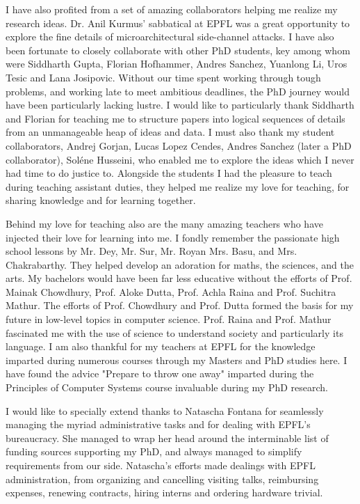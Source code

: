 I have also profited from a set of amazing collaborators helping me realize my
research ideas. 
Dr. Anil Kurmus' sabbatical at EPFL was a great opportunity to explore the
fine details of microarchitectural side-channel attacks.
I have also been fortunate to closely collaborate with other PhD students,
key among whom were Siddharth Gupta, Florian Hofhammer, Andres Sanchez, Yuanlong Li,
Uros Tesic and Lana Josipovic. 
Without our time spent working through tough problems, and working late to meet
ambitious deadlines, the PhD journey would have been particularly lacking lustre.
I would like to particularly thank Siddharth and Florian for teaching me to
structure papers into logical sequences of details from an unmanageable heap of
ideas and data.
I must also thank my student collaborators, Andrej Gorjan, Lucas Lopez Cendes, 
Andres Sanchez (later a PhD collaborator), Soléne Husseini, who enabled me to 
explore the ideas which I never had time to do justice to. 
Alongside the students I had the pleasure to teach during teaching assistant
duties, they helped me realize my love for teaching, for sharing knowledge
and for learning together.

Behind my love for teaching also are the many amazing teachers who have
injected their love for learning into me.
I fondly remember the passionate high school lessons by 
Mr. Dey, Mr. Sur, Mr. Royan Mrs. Basu, and Mrs. Chakrabarthy.
They helped develop an adoration for maths, the sciences, and the arts.
My bachelors would have been far less educative without the efforts 
of Prof. Mainak Chowdhury, Prof. Aloke Dutta, Prof. Achla Raina
and Prof. Suchitra Mathur.
The efforts of Prof. Chowdhury and Prof. Dutta formed the basis for my
future in low-level topics in computer science. 
Prof. Raina and Prof. Mathur fascinated me with the use of science to
understand society and particularly its language.
I am also thankful for my teachers at EPFL for the knowledge imparted during
numerous courses through my Masters and PhD studies here.
I have found the advice "Prepare to throw one away" imparted during the
Principles of Computer Systems course invaluable during my
PhD research.

I would like to specially extend thanks to Natascha Fontana for seamlessly 
managing the myriad administrative tasks and for dealing with EPFL's bureaucracy.
She managed to wrap her head around the interminable list of funding sources
supporting my PhD, and always managed to simplify requirements from our side.
Natascha's efforts made dealings with EPFL administration, from organizing and
cancelling visiting talks, reimbursing expenses, renewing contracts, 
hiring interns and ordering hardware trivial.

